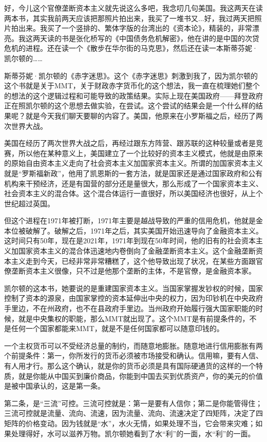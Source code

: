 \documentclass[UTF8, 12pt, a4paper]{ctexrep}
\begin{document}
好，今儿这个官僚垄断资本主义就先说这么多吧，我念叨几句美国。我这两天在读两本书，其实我前两天应该把那照片拍出来，我买了一堆书又...好，我过两天把照片拍出来。我买了一个竖排的、繁体字版的台湾出的《资本论》，精装的，非常漂亮。我这两天读的书是张化桥写的《中国债务危机解密》，他在讲的是中国的次贷危机的进程。还在读一个《散步在华尔街的马克思》，然后还在读一本斯蒂芬妮·凯尔顿的……

斯蒂芬妮·凯尔顿的《赤字迷思》。这个《赤字迷思》刺激到我了，因为凯尔顿的这个书就是关于MMT，关于财政赤字货币化的这个想法，我一直在梳理她们整个的想法的这个逻辑过程和可能导致的政策结果。实际上现在美国政府——拜登政府正在照凯尔顿的这个思想去做实验，在尝试。这个尝试的结果会是一个什么样的结果呢？就是今天我们聊天要聊的内容了。美国，他原来在小罗斯福之后，经历了两次世界大战。

美国在经历了两次世界大战之后，再经过跟东方阵营、跟苏联的这种较量或者是竞赛，所以他在某种意义上，美国建立了一个比较好的资本主义模式，他就是由原来的原始自由资本主义走向了社会资本主义加国家资本主义。所谓的加国家资本主义就是“罗斯福新政”，他用了凯恩斯的一套方法，就是国家还是通过国家政府和公有机构来干预经济，还是有国营的部分还是量很大，那么形成了一个国家资本主义、社会资本主义的混合体。这个混合体运行一直很好，所以美国经济也很好，从上个世纪超过英国。

但这个进程在1971年被打断，1971年主要是越战导致的严重的信用危机，他就是金本位被破解了。破解之后，1971年之后，其实美国开始迅速导向了金融资本主义。这时间只有50年，现在是2021年，1971年到现在50年时间，他的旧有的社会资本主义加国家资本主义的混合体迅速地内卷倒向了金融垄断资本主义。这个金融垄断资本主义走到今天，已经非常非常糟糕了，这个他导致出现了状况，在某些方面跟官僚垄断资本主义很像，只不过是他那个垄断的主体，不是官僚，是金融资本家。

凯尔顿的这本书，她要说的是重建国家资本主义。当国家掌握发钞权的时候，国家控制了资本的源泉，由国家掌控的资本延伸出中央的权力，因为印钞机在中央政府手里边，不在州政府，也不在县政府手里边。当州政府开始履行强大国家职能的时候，就是中央集权的职能，那么MMT就出现了。这个MMT是有前提条件的，不是任何一个国家都能来MMT，就是不是任何国家都可以随意印钱的。

一个主权货币可以不受经济总量的制约，而随意地膨胀。随意地进行信用膨胀有两个前提条件：第一，你所发行的货币必须被市场接受和确认。信用嘛，要有人信、有人用才行。那么这个确认，就是你的货币必须是具有国际硬通货的这样的一个特质，就是你能从中国买到廉价商品，你能到中国去买到优质资产，你的美元的价值是被中国承认的，这是第一条。

第二条，是“三流”可控。三流可控就是：第一是要有人信你；第二是你能管得住；三流可控就是流量、流向、流速，因为流量、流向、流速决定了四矩阵，决定了四矩阵的价格变动。因为钱就是“水”，水火无情，如果处理不当，它会带来灾难；如果处理得好，水可以滋养万物。凯尔顿她看到了水“利”的一面，水“利”的一面。
\end{document}
